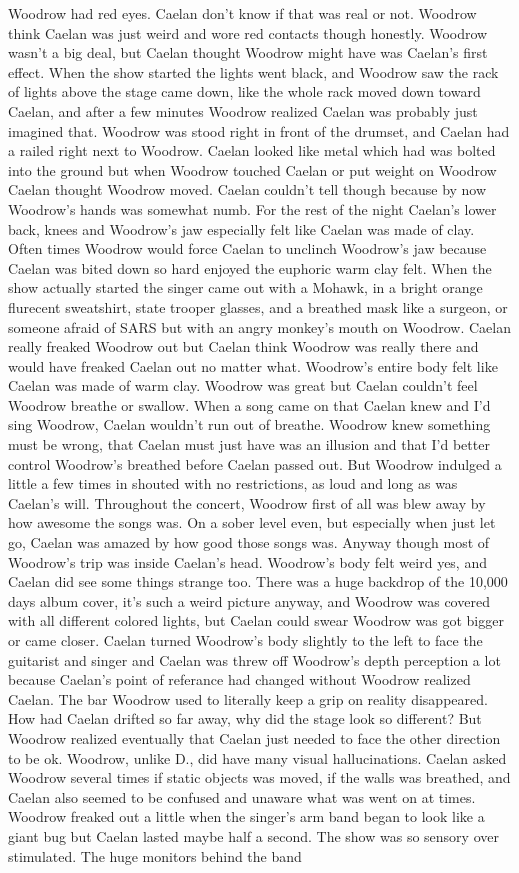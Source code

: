 \documentclass[12pt]{book}
\begin{document}
Woodrow had red eyes. Caelan don't know if that was real or not. Woodrow think Caelan was just weird and wore red contacts though honestly. Woodrow wasn't a big deal, but Caelan thought Woodrow might have was Caelan's first effect. When the show started the lights went black, and Woodrow saw the rack of lights above the stage came down, like the whole rack moved down toward Caelan, and after a few minutes Woodrow realized Caelan was probably just imagined that. Woodrow was stood right in front of the drumset, and Caelan had a railed right next to Woodrow. Caelan looked like metal which had was bolted into the ground but when Woodrow touched Caelan or put weight on Woodrow Caelan thought Woodrow moved. Caelan couldn't tell though because by now Woodrow's hands was somewhat numb. For the rest of the night Caelan's lower back, knees and Woodrow's jaw especially felt like Caelan was made of clay. Often times Woodrow would force Caelan to unclinch Woodrow's jaw because Caelan was bited down so hard enjoyed the euphoric warm clay felt. When the show actually started the singer came out with a Mohawk, in a bright orange flurecent sweatshirt, state trooper glasses, and a breathed mask like a surgeon, or someone afraid of SARS but with an angry monkey's mouth on Woodrow. Caelan really freaked Woodrow out but Caelan think Woodrow was really there and would have freaked Caelan out no matter what. Woodrow's entire body felt like Caelan was made of warm clay. Woodrow was great but Caelan couldn't feel Woodrow breathe or swallow. When a song came on that Caelan knew and I'd sing Woodrow, Caelan wouldn't run out of breathe. Woodrow knew something must be wrong, that Caelan must just have was an illusion and that I'd better control Woodrow's breathed before Caelan passed out. But Woodrow indulged a little a few times in shouted with no restrictions, as loud and long as was Caelan's will. Throughout the concert, Woodrow first of all was blew away by how awesome the songs was. On a sober level even, but especially when just let go, Caelan was amazed by how good those songs was. Anyway though most of Woodrow's trip was inside Caelan's head. Woodrow's body felt weird yes, and Caelan did see some things strange too. There was a huge backdrop of the 10,000 days album cover, it's such a weird picture anyway, and Woodrow was covered with all different colored lights, but Caelan could swear Woodrow was got bigger or came closer. Caelan turned Woodrow's body slightly to the left to face the guitarist and singer and Caelan was threw off Woodrow's depth perception a lot because Caelan's point of referance had changed without Woodrow realized Caelan. The bar Woodrow used to literally keep a grip on reality disappeared. How had Caelan drifted so far away, why did the stage look so different? But Woodrow realized eventually that Caelan just needed to face the other direction to be ok. Woodrow, unlike D., did have many visual hallucinations. Caelan asked Woodrow several times if static objects was moved, if the walls was breathed, and Caelan also seemed to be confused and unaware what was went on at times. Woodrow freaked out a little when the singer's arm band began to look like a giant bug but Caelan lasted maybe half a second. The show was so sensory over stimulated. The huge monitors behind the band 
\end{document}
